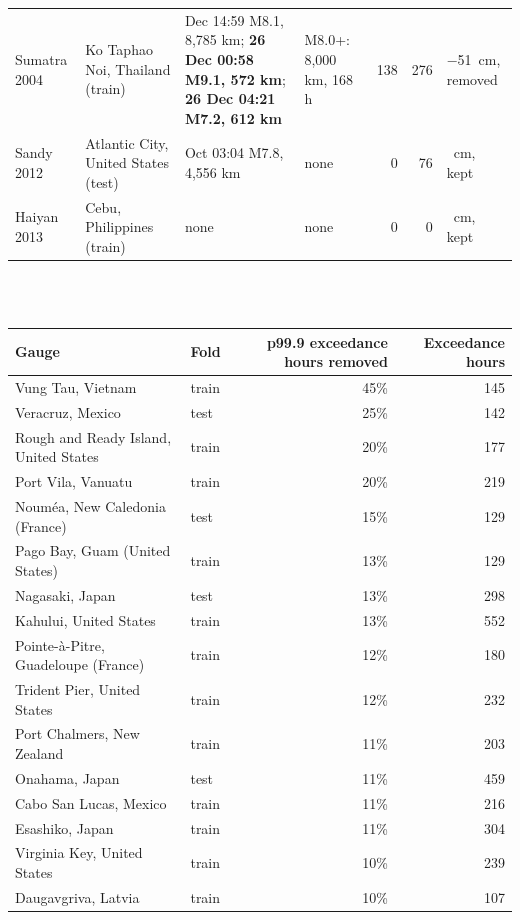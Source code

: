 \begin{table}[h]
\begin{tabular}{p{}p{}p{}p{}rrp{}}
\raggedright\arraybackslash Sumatra 2004 & \raggedright\arraybackslash Ko Taphao Noi, Thailand (train) & \raggedright\arraybackslash 23 Dec 14:59 M8.1, 8,785 km; \textbf{26 Dec 00:58 M9.1, 572 km}; \textbf{26 Dec 04:21 M7.2, 612 km} & \raggedright\arraybackslash M8.0+: 8,000 km, 168 h & 138 & 276 & \raggedright\arraybackslash $-$51~cm, removed\\
\raggedright\arraybackslash Sandy 2012 & \raggedright\arraybackslash Atlantic City, United States (test) & \raggedright\arraybackslash 28 Oct 03:04 M7.8, 4,556 km & \raggedright\arraybackslash none & 0 & 76 & \raggedright\arraybackslash 151~cm, kept\\
\raggedright\arraybackslash Haiyan 2013 & \raggedright\arraybackslash Cebu, Philippines (train) & \raggedright\arraybackslash none & \raggedright\arraybackslash none & 0 & 0 & \raggedright\arraybackslash 42~cm, kept\\
\bottomrule\end{tabular}\\[1.0em]
\\[0.2em]
\begin{tabular}{llrr}\toprule
Gauge & Fold & p99.9 exceedance hours removed & Exceedance hours\\\midrule
Vung Tau, Vietnam & train & 45\% & 145\\
Veracruz, Mexico & test & 25\% & 142\\
Rough and Ready Island, United States & train & 20\% & 177\\
Port Vila, Vanuatu & train & 20\% & 219\\
Nouméa, New Caledonia (France) & test & 15\% & 129\\
Pago Bay, Guam (United States) & train & 13\% & 129\\
Nagasaki, Japan & test & 13\% & 298\\
Kahului, United States & train & 13\% & 552\\
Pointe-à-Pitre, Guadeloupe (France) & train & 12\% & 180\\
Trident Pier, United States & train & 12\% & 232\\
Port Chalmers, New Zealand & train & 11\% & 203\\
Onahama, Japan & test & 11\% & 459\\
Cabo San Lucas, Mexico & train & 11\% & 216\\
Esashiko, Japan & train & 11\% & 304\\
Virginia Key, United States & train & 10\% & 239\\
Daugavgriva, Latvia & train & 10\% & 107\\
\bottomrule\end{tabular}
\end{table}

